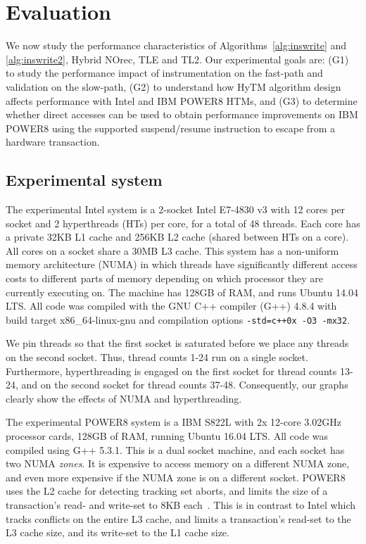 \section{Evaluation}
\label{sec:eval}
%
We now study the performance characteristics of Algorithms~\ref{alg:inswrite} and \ref{alg:inswrite2}, Hybrid NOrec, TLE and TL2.
Our experimental goals are: (G1) to study the performance impact of instrumentation on the fast-path and validation on the slow-path, 
(G2) to understand how HyTM algorithm design affects performance with Intel and IBM POWER8 HTMs, and 
(G3) to determine whether direct accesses can be used to obtain performance improvements on IBM POWER8 using the supported suspend/resume instruction to escape from a hardware transaction.

\subsection{Experimental system}
The experimental Intel system is a 2-socket Intel E7-4830 v3 with 12 cores per socket and 2 hyperthreads (HTs) per core, for a total of 48 threads.
Each core has a private 32KB L1 cache and 256KB L2 cache (shared between HTs on a core).
All cores on a socket share a 30MB L3 cache.
This system has a non-uniform memory architecture (NUMA) in which threads have significantly different access costs to different parts of memory depending on which processor they are currently executing on.
The machine has 128GB of RAM, and runs Ubuntu 14.04 LTS.
All code was compiled with the GNU C++ compiler (G++) 4.8.4 with build target x86\_64-linux-gnu and compilation options \texttt{-std=c++0x -O3 -mx32}.

We pin threads so that the first socket is saturated before we place any threads on the second socket.
Thus, thread counts 1-24 run on a single socket.
Furthermore, hyperthreading is engaged on the first socket for thread counts 13-24, and on the second socket for thread counts 37-48.
Consequently, our graphs clearly show the effects of NUMA and hyperthreading.

The experimental POWER8 system is a IBM S822L with 2x 12-core 3.02GHz processor cards, 128GB of RAM, running Ubuntu 16.04 LTS.
All code was compiled using G++ 5.3.1.
This is a dual socket machine, and each socket has two NUMA \emph{zones}.
It is expensive to access memory on a different NUMA zone, and even more expensive if the NUMA zone is on a different socket.
POWER8 uses the L2 cache for detecting tracking set aborts, and limits the size of a transaction's read- and write-set to 8KB each~\cite{htm-survey}.
This is in contrast to Intel which tracks conflicts on the entire L3 cache, and limits a transaction's read-set to the L3 cache size, and its write-set to the L1 cache size.

